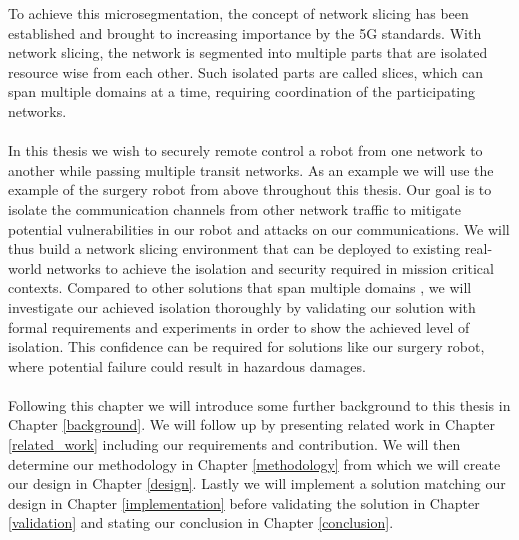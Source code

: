 To achieve this \gls{microsegmentation}, the concept of network slicing \cite{slicing} has been established and brought to increasing importance by the 5G standards. With network slicing, the network is segmented into multiple parts that are isolated resource wise from each other. Such isolated parts are called slices, which can span multiple domains at a time, requiring coordination of the participating networks.

\paragraph{} In this thesis we wish to securely remote control a robot from one network to another while passing multiple transit networks. As an example we will use the example of the surgery robot from above throughout this thesis. Our goal is to isolate the communication channels from other network traffic to mitigate potential vulnerabilities in our robot and attacks on our communications. We will thus build a network slicing environment that can be deployed to existing real-world networks to achieve the isolation and security required in mission critical contexts. Compared to other solutions that span multiple domains \cite{MD1,MD2,MD3,MD4,MD5}, we will investigate our achieved isolation thoroughly by validating our solution with formal requirements and experiments in order to show the achieved level of isolation. This confidence can be required for solutions like our surgery robot, where potential failure could result in hazardous damages.

\paragraph{} Following this chapter we will introduce some further background to this thesis in Chapter \ref{background}. We will follow up by presenting related work in Chapter \ref{related_work} including our requirements and contribution. We will then determine our methodology in Chapter \ref{methodology} from which we will create our design in Chapter \ref{design}. Lastly we will implement a solution matching our design in Chapter \ref{implementation} before validating the solution in Chapter \ref{validation} and stating our conclusion in Chapter \ref{conclusion}.
